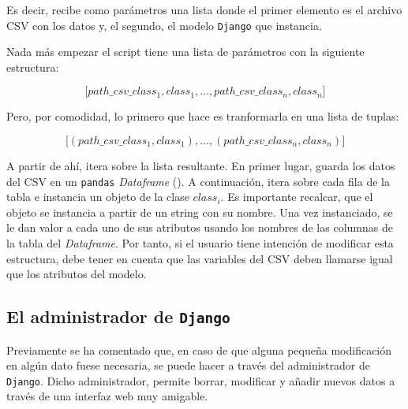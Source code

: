 Es decir, recibe como parámetros una lista donde el primer elemento es el archivo CSV con los datos y, el segundo, el modelo \texttt{Django} que instancia.

Nada más empezar el script tiene una lista de parámetros con la siguiente estructura:

\begin{displaymath}
    \Bigg[path\_csv\_class_1, class_1, \ldots, path\_csv\_class_n, class_n \Bigg]
\end{displaymath}

Pero, por comodidad, lo primero que hace es tranformarla en una lista de tuplas:

\begin{displaymath}
    \Bigg[(path\_csv\_class_1, class_1), \ldots, (path\_csv\_class_n, class_n) \Bigg]
\end{displaymath}

A partir de ahí, itera sobre la lista resultante. En primer lugar, guarda los datos del CSV en un \texttt{pandas} \textit{Dataframe} (\cite{dataframe}). A continuación, itera sobre cada fila de la tabla e instancia un objeto de la clase $class_i$. Es importante recalcar, que el objeto se instancia a partir de un string con su nombre. Una vez instanciado, se le dan valor a cada uno de sus atributos usando los nombres de las columnas de la tabla del \textit{Dataframe}. Por tanto, si el usuario tiene intención de modificar esta estructura, debe tener en cuenta que las variables del CSV deben llamarse igual que los atributos del modelo.

\subsection{El administrador de \texttt{Django}}
Previamente se ha comentado que, en caso de que alguna pequeña modificación en algún dato fuese necesaria, se puede hacer a través del administrador de \texttt{Django}. Dicho administrador, permite borrar, modificar y añadir nuevos datos a través de una interfaz web muy amigable.

